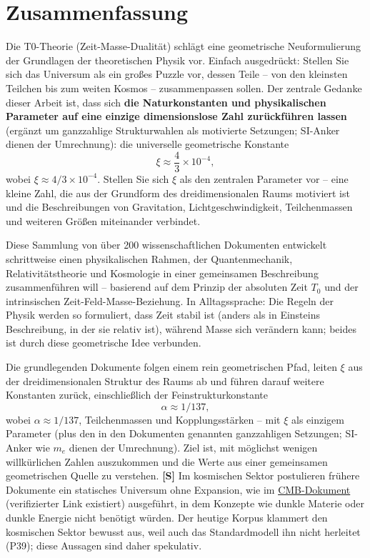 \section*{Zusammenfassung}
	Die T0-Theorie (Zeit-Masse-Dualität) schlägt eine geometrische Neuformulierung der Grundlagen der theoretischen Physik vor. Einfach ausgedrückt: Stellen Sie sich das Universum als ein großes Puzzle vor, dessen Teile – von den kleinsten Teilchen bis zum weiten Kosmos – zusammenpassen sollen. Der zentrale Gedanke dieser Arbeit ist, dass sich \textbf{die Naturkonstanten und physikalischen Parameter auf eine einzige dimensionslose Zahl zurückführen lassen} (ergänzt um ganzzahlige Strukturwahlen als motivierte Setzungen; SI-Anker dienen der Umrechnung): die universelle geometrische Konstante
	\[
	\xi \approx \frac{4}{3} \times 10^{-4},
	\]
	wobei $\xi \approx 4/3 \times 10^{-4}$. Stellen Sie sich $\xi$ als den zentralen Parameter vor – eine kleine Zahl, die aus der Grundform des dreidimensionalen Raums motiviert ist und die Beschreibungen von Gravitation, Lichtgeschwindigkeit, Teilchenmassen und weiteren Größen miteinander verbindet.
	
	Diese Sammlung von über 200 wissenschaftlichen Dokumenten entwickelt schrittweise einen physikalischen Rahmen, der Quantenmechanik, Relativitätstheorie und Kosmologie in einer gemeinsamen Beschreibung zusammenführen will – basierend auf dem Prinzip der absoluten Zeit $T_0$ und der intrinsischen Zeit-Feld-Masse-Beziehung. In Alltagssprache: Die Regeln der Physik werden so formuliert, dass Zeit stabil ist (anders als in Einsteins Beschreibung, in der sie relativ ist), während Masse sich verändern kann; beides ist durch diese geometrische Idee verbunden.
	
	Die grundlegenden Dokumente folgen einem rein geometrischen Pfad, leiten $\xi$ aus der dreidimensionalen Struktur des Raums ab und führen darauf weitere Konstanten zurück, einschließlich der Feinstrukturkonstante
	\[
	\alpha \approx 1/137,
	\]
	wobei $\alpha \approx 1/137$, Teilchenmassen und Kopplungsstärken – mit $\xi$ als einzigem Parameter (plus den in den Dokumenten genannten ganzzahligen Setzungen; SI-Anker wie $m_e$ dienen der Umrechnung). Ziel ist, mit möglichst wenigen willkürlichen Zahlen auszukommen und die Werte aus einer gemeinsamen geometrischen Quelle zu verstehen. \textbf{[S]} Im kosmischen Sektor postulieren frühere Dokumente ein statisches Universum ohne Expansion, wie im \href{https://github.com/jpascher/T0-Time-Mass-Duality/blob/main/2/pdf/140_T0_CMB_Donoghue_Analyse_En.pdf}{CMB-Dokument} (verifizierter Link existiert) ausgeführt, in dem Konzepte wie dunkle Materie oder dunkle Energie nicht benötigt würden. Der heutige Korpus klammert den kosmischen Sektor bewusst aus, weil auch das Standardmodell ihn nicht herleitet (P39); diese Aussagen sind daher spekulativ.
	
